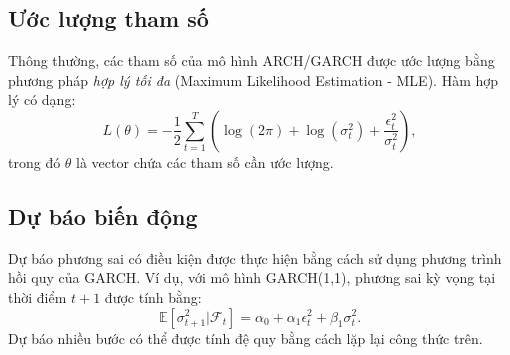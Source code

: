 \subsection{Ước lượng tham số}
Thông thường, các tham số của mô hình ARCH/GARCH được ước lượng bằng phương pháp \textit{hợp lý tối đa} (Maximum Likelihood Estimation - MLE). Hàm hợp lý có dạng:
\begin{equation}
    L(\theta) = -\frac{1}{2} \sum_{t=1}^{T} \left(\log(2\pi) + \log(\sigma_t^2) + \frac{\epsilon_t^2}{\sigma_t^2} \right),
\end{equation}
trong đó $\theta$ là vector chứa các tham số cần ước lượng.

\subsection{Dự báo biến động}
Dự báo phương sai có điều kiện được thực hiện bằng cách sử dụng phương trình hồi quy của GARCH. Ví dụ, với mô hình GARCH(1,1), phương sai kỳ vọng tại thời điểm $t+1$ được tính bằng:
\begin{equation}
    \mathbb{E}[\sigma_{t+1}^2 | \mathcal{F}_t] = \alpha_0 + \alpha_1 \epsilon_t^2 + \beta_1 \sigma_t^2.
\end{equation}
Dự báo nhiều bước có thể được tính đệ quy bằng cách lặp lại công thức trên.